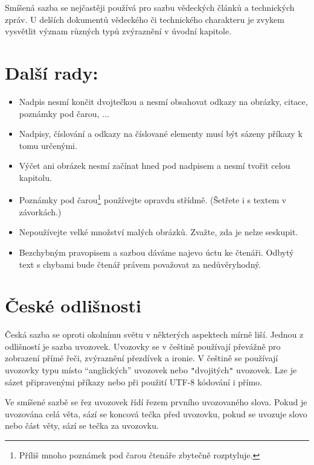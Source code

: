 \documentclass[twocolumn, 10pt, a4paper]{article}
\begin{document}
Smíšená sazba se nejčastěji používá pro sazbu vě\-dec\-kých článků a technických zpráv. U delších dokumentů vědeckého či technického charakteru je zvykem vysvětlit význam různých typů zvýraznění v úvodní kapitole.

\section{Další rady:}
\label{3}
\begin{itemize}


    \item Nadpis nesmí končit dvojtečkou a nesmí obsahovat odkazy na obrázky, citace, poznámky pod čarou, ...

    \item Nadpisy, číslování a odkazy na číslované elementy musí být sázeny příkazy k tomu určenými.

    \item Výčet ani obrázek nesmí začínat hned pod nadpisem a nesmí tvořit celou kapitolu.

    \item Poznámky pod čarou\footnote{Příliš mnoho poznámek pod čarou čtenáře zbytečně rozptyluje.} používejte opravdu střídmě. (Šetřete i s textem v závorkách.)

    \item Nepoužívejte velké množství malých obrázků. Zvažte, zda je nelze seskupit.

    \item Bezchybným pravopisem a sazbou dáváme najevo úctu ke čtenáři. Odbytý text s chybami bude čtenář právem považovat za nedůvěryhodný.


\end{itemize}

\section{České odlišnosti}

Česká sazba se oproti okolnímu světu v některých aspektech mírně liší. Jednou z odlišností je sazba uvozovek. Uvozovky se v češtině používají převážně pro zobrazení přímé řeči, zvýraznění přezdívek a ironie. V češtině se používají uvozovky typu  místo ``anglických'' uvozovek nebo \verb|"|dvojitých\verb|"| uvozovek. Lze je sázet připravenými příkazy nebo při použití UTF-8 kódování i přímo.

Ve smíšené sazbě se řez uvozovek řídí řezem prvního uvozovaného slova. Pokud je uvozována celá věta, sází se koncová tečka před uvozovku, pokud se uvozuje slovo nebo část věty, sází se tečka za uvozovku.
\end{document}
